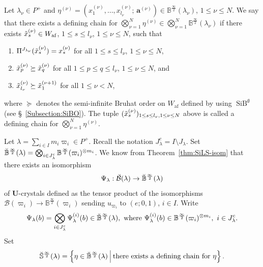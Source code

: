 \documentclass[ALCO,ThmDefs,Unicode,epreuves]{cedram}
\newcommand\bm[1]{\boldsymbol{#1}}
\renewcommand{\U}{\mathbf{U}}
\newcommand{\si}{\frac{\infty}{2}}
\DeclareMathOperator{\af}{af}
\DeclareMathOperator{\SiB}{SiB}
\begin{document}
\begin{defi}
Let 
$\lambda_{\nu} \in P^+$
and 
$\eta^{(\nu)} = \left( x^{(\nu)}_1 , \ldots , x^{(\nu)}_{l_{\nu}} ;\, 
\bm{a}^{(\nu)} \right) \in \mathbb{B}^{\si}(\lambda_{\nu})$, 
$1 \leq \nu \leq N$. 
We say that there exists a defining chain for
$\bigotimes_{\nu = 1}^N \eta^{(\nu)} \in \bigotimes_{\nu = 1}^N \mathbb{B}^{\si}(\lambda_{\nu})$ 
if there exists 
$\Tilde{x}^{(\nu)}_s \in W_{\af}$, 
$1 \leq s \leq l_{\nu}$, $1 \leq \nu \leq N$, 
such that 
\begin{enumerate}[label=(DC\arabic*)]
\item
$\Pi^{J_{\lambda_{\nu}}}(\Tilde{x}^{(\nu)}_s) = x^{(\nu)}_s$ 
for all $1 \leq s \leq l_{\nu}$, $1 \leq \nu \leq N$, 
\item
$\Tilde{x}^{(\nu)}_p \succeq \Tilde{x}^{(\nu)}_q$ 
for all
$1 \leq p \leq q \leq l_{\nu}$, 
$1 \leq \nu \leq N$, 
and 
\item
$\Tilde{x}^{(\nu)}_{l_{\nu}} \succeq \Tilde{x}^{(\nu + 1)}_1$ 
for all $1 \leq \nu < N$, 
\end{enumerate}
where $\succeq$ 
denotes the semi-infinite Bruhat order 
on $W_{\af}$ defined by using 
$\SiB ^{\emptyset}$
(see \S~\ref{Subsection:SiBO}). 
The tuple
$( \Tilde{x}^{(\nu)}_s )_{1 \leq s \leq l_{\nu}, 1 \leq \nu \leq N}$
above is called a defining chain for 
$\bigotimes_{\nu = 1}^N \eta^{(\nu)}$.
\end{defi}

Let 
$\lambda = \sum_{i \in I} m_i \varpi_i \in P^+$. 
Recall the notation
$J_{\lambda}^c = I \setminus J_{\lambda}$. 
Set
$\Breve{\mathbb{B}}^{\si}(\lambda) = \bigotimes_{i \in J_{\lambda}^c} \mathbb{B}^{\si}(\varpi_i)^{\otimes m_i}$.
We know from Theorem~\ref{thm:SiLS-isom} that there exists an isomorphism 
\begin{align}
\Psi_{\lambda} : \Breve{\mathcal{B}}(\lambda) \rightarrow \Breve{\mathbb{B}}^{\si}(\lambda)
\end{align}
of $\U$-crystals 
defined as the tensor product of the isomorphisms 
$\mathcal{B}(\varpi_i) \rightarrow \mathbb{B}^{\si}(\varpi_i)$
sending 
$u_{\varpi_i}$ 
to 
$(e;0,1)$, 
$i \in I$. 
Write
\begin{align}
\Psi_{\lambda}(b) 
= 
\bigotimes_{i \in J_{\lambda}^c} \Psi^{(i)}_{\lambda}(b) \in \Breve{\mathbb{B}}^{\si}(\lambda), 
\ \text{where} \ 
\Psi^{(i)}_{\lambda}(b) \in \mathbb{B}^{\si}(\varpi_i)^{\otimes m_i}, \ 
i \in J_{\lambda}^c .
\end{align}
Set 
\begin{align}
\Breve{\mathbb{S}}^{\si}(\lambda) 
= 
\left\{ \eta \in \Breve{\mathbb{B}}^{\si}(\lambda) 
\ \vline \ 
\text{there exists a defining chain for} \ \eta \right\} .
\end{align}
\end{document}
